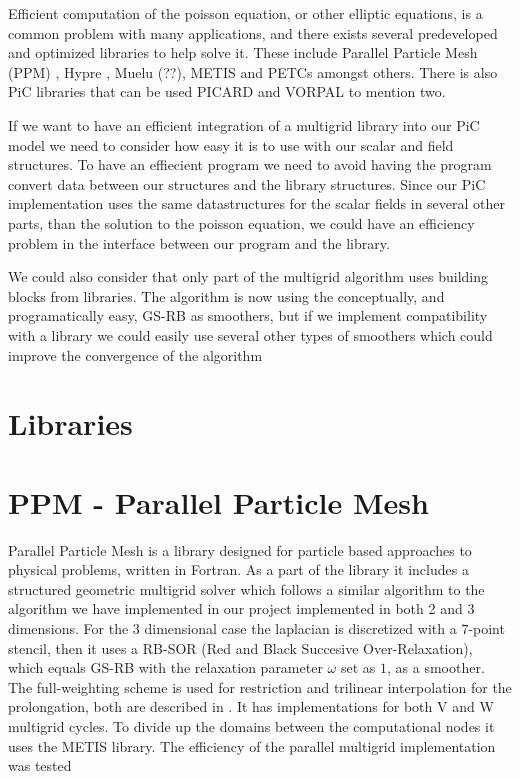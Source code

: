 

Efficient computation of the poisson equation, or other elliptic equations, is a common problem with many applications, and there exists several predeveloped and optimized libraries to help solve it. These include Parallel Particle Mesh (PPM) \citep{sbalzarini_ppm_2006}, Hypre \citep{falgout_hypre:_2002}, Muelu (??), METIS \citep{_fast_????} and PETCs \citep{_manual.pdf_????} amongst others. There is also PiC libraries that can be used PICARD and VORPAL to mention two.

If we want to have an efficient integration of a multigrid library into our PiC model we need to consider how easy it is to use with our scalar and field structures. To have an effiecient program we need to avoid having the program convert data between our structures and the library structures. Since our PiC implementation uses the same datastructures for the scalar fields in several other parts, than the solution to the poisson equation, we could have an efficiency problem in the interface between our program and the library.

We could also consider that only part of the multigrid algorithm uses building blocks from libraries. The algorithm is now using the conceptually, and programatically easy, GS-RB as smoothers, but if we implement compatibility with a library we could easily use several other types of smoothers which could improve the convergence of the algorithm

\section{Libraries}

\section{PPM - Parallel Particle Mesh}
Parallel Particle Mesh is a library designed for particle based approaches to physical problems, written in Fortran. As a part of the library it includes a structured geometric multigrid solver which follows a similar algorithm to the algorithm we have implemented in our project implemented in both 2 and 3 dimensions. For the 3 dimensional case the laplacian is discretized with a \(7\)-point stencil, then it uses a RB-SOR (Red and Black Succesive Over-Relaxation), which equals GS-RB with the relaxation parameter \(\omega\) set as \(1\), as a smoother. The full-weighting scheme is used for restriction and trilinear interpolation for the prolongation, both are described in \citep{trottenberg_multigrid_2000}. It has implementations for both V and W multigrid cycles. To divide up the domains between the computational nodes it uses the METIS library. The efficiency of the parallel multigrid implementation was tested

